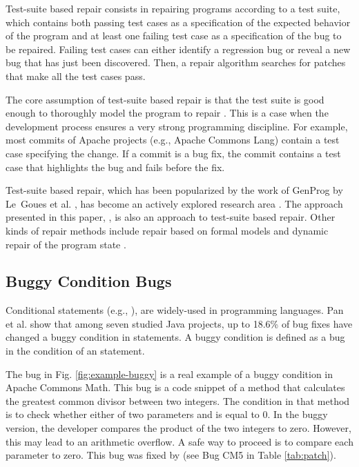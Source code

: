 Test-suite based repair consists in repairing programs according to a test suite, which contains both passing test cases as a specification of the expected behavior of the program and at least one failing test case as a specification of the bug to be repaired.
Failing test cases can either identify a regression bug or reveal a new bug that has just been discovered.
Then, a repair algorithm searches for patches that make all the test cases pass.

The core assumption of test-suite based repair is that the test suite is good enough to thoroughly model the program to repair \cite{monperrus2014critical}. This is a case when the development process ensures a very strong programming discipline. For example, most commits of Apache projects (e.g., Apache Commons Lang) contain a test case specifying the change. If a commit is a bug fix, the commit contains a test case that highlights the bug and fails before the fix.

Test-suite based repair, which has been popularized by the work of GenProg by Le~Goues et al. \cite{le2012genprog}, has become an actively explored research area \cite{nguyen2013semfix,Kim2013,qi2014strength,qi2015efficient,DBLP:conf/sigsoft/LongR15}.
The approach presented in this paper, \nopol, is also an approach to test-suite based repair. Other kinds of repair methods include repair based on formal models \cite{Jobstmann2005} and dynamic repair of the program state \cite{Perkins2009}. 

\subsection{Buggy \ourif Condition Bugs}

Conditional statements (e.g., ), are widely-used in programming languages. Pan et al. \cite{pan2009toward} show that among seven studied Java projects, up to 18.6\% of bug fixes have changed a buggy condition in \ourif statements. A buggy \ourif condition is defined as a bug in the condition of an  statement. 

The bug in Fig. \ref{fig:example-buggy} is a real example of a buggy \ourif condition in Apache Commons Math. This bug is a code snippet of a method that calculates the greatest common divisor between two integers. The condition in that method is to check whether either of two parameters  and  is equal to 0. In the buggy version, the developer compares the product of the two integers to zero. However, this may lead to an arithmetic overflow. A safe way to proceed is to compare each parameter to zero. This bug was fixed by \nopol (see Bug CM5 in Table \ref{tab:patch}).

